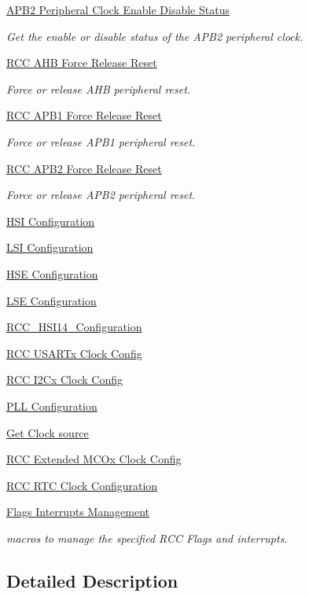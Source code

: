 \begin{DoxyCompactItemize}
\hyperlink{group___r_c_c___a_p_b2___peripheral___clock___enable___disable___status}{A\+P\+B2 Peripheral Clock Enable Disable Status}
\begin{DoxyCompactList}\small\item\em Get the enable or disable status of the A\+P\+B2 peripheral clock. \end{DoxyCompactList}\item 
\hyperlink{group___r_c_c___a_h_b___force___release___reset}{R\+C\+C A\+H\+B Force Release Reset}
\begin{DoxyCompactList}\small\item\em Force or release A\+HB peripheral reset. \end{DoxyCompactList}\item 
\hyperlink{group___r_c_c___a_p_b1___force___release___reset}{R\+C\+C A\+P\+B1 Force Release Reset}
\begin{DoxyCompactList}\small\item\em Force or release A\+P\+B1 peripheral reset. \end{DoxyCompactList}\item 
\hyperlink{group___r_c_c___a_p_b2___force___release___reset}{R\+C\+C A\+P\+B2 Force Release Reset}
\begin{DoxyCompactList}\small\item\em Force or release A\+P\+B2 peripheral reset. \end{DoxyCompactList}\item 
\hyperlink{group___r_c_c___h_s_i___configuration}{H\+S\+I Configuration}
\item 
\hyperlink{group___r_c_c___l_s_i___configuration}{L\+S\+I Configuration}
\item 
\hyperlink{group___r_c_c___h_s_e___configuration}{H\+S\+E Configuration}
\item 
\hyperlink{group___r_c_c___l_s_e___configuration}{L\+S\+E Configuration}
\item 
\hyperlink{group___r_c_c___h_s_i14___configuration}{R\+C\+C\+\_\+\+H\+S\+I14\+\_\+\+Configuration}
\item 
\hyperlink{group___r_c_c___u_s_a_r_tx___clock___config}{R\+C\+C U\+S\+A\+R\+Tx Clock Config}
\item 
\hyperlink{group___r_c_c___i2_cx___clock___config}{R\+C\+C I2\+Cx Clock Config}
\item 
\hyperlink{group___r_c_c___p_l_l___configuration}{P\+L\+L Configuration}
\item 
\hyperlink{group___r_c_c___get___clock__source}{Get Clock source}
\item 
\hyperlink{group___r_c_c_ex___m_c_ox___clock___config}{R\+C\+C Extended M\+C\+Ox Clock Config}
\item 
\hyperlink{group___r_c_c___r_t_c___clock___configuration}{R\+C\+C R\+T\+C Clock Configuration}
\item 
\hyperlink{group___r_c_c___flags___interrupts___management}{Flags Interrupts Management}
\begin{DoxyCompactList}\small\item\em macros to manage the specified R\+CC Flags and interrupts. \end{DoxyCompactList}\end{DoxyCompactItemize}


\subsection{Detailed Description}
